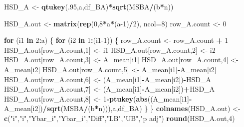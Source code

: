\documentclass[
]{book}
\newenvironment{Shaded}{\begin{snugshade}}{\end{snugshade}}
\newcommand{\AttributeTok}[1]{\textcolor[rgb]{0.13,0.29,0.53}{#1}}
\newcommand{\ControlFlowTok}[1]{\textcolor[rgb]{0.13,0.29,0.53}{\textbf{#1}}}
\newcommand{\DecValTok}[1]{\textcolor[rgb]{0.00,0.00,0.81}{#1}}
\newcommand{\FunctionTok}[1]{\textcolor[rgb]{0.13,0.29,0.53}{\textbf{#1}}}
\newcommand{\NormalTok}[1]{#1}
\newcommand{\OtherTok}[1]{\textcolor[rgb]{0.56,0.35,0.01}{#1}}
\newcommand{\SpecialCharTok}[1]{\textcolor[rgb]{0.81,0.36,0.00}{\textbf{#1}}}
\newcommand{\StringTok}[1]{\textcolor[rgb]{0.31,0.60,0.02}{#1}}
\begin{document}
\begin{Shaded}
\begin{Highlighting}[]
\NormalTok{HSD\_A }\OtherTok{\textless{}{-}} \FunctionTok{qtukey}\NormalTok{(.}\DecValTok{95}\NormalTok{,a,df\_BA)}\SpecialCharTok{*}\FunctionTok{sqrt}\NormalTok{(MSBA}\SpecialCharTok{/}\NormalTok{(b}\SpecialCharTok{*}\NormalTok{n))}

\NormalTok{HSD\_A.out }\OtherTok{\textless{}{-}} \FunctionTok{matrix}\NormalTok{(}\FunctionTok{rep}\NormalTok{(}\DecValTok{0}\NormalTok{,}\DecValTok{8}\SpecialCharTok{*}\NormalTok{a}\SpecialCharTok{*}\NormalTok{(a}\DecValTok{{-}1}\NormalTok{)}\SpecialCharTok{/}\DecValTok{2}\NormalTok{), }\AttributeTok{ncol=}\DecValTok{8}\NormalTok{)}
\NormalTok{row\_A.count }\OtherTok{\textless{}{-}} \DecValTok{0}

\ControlFlowTok{for}\NormalTok{ (i1 }\ControlFlowTok{in} \DecValTok{2}\SpecialCharTok{:}\NormalTok{a) \{}
  \ControlFlowTok{for}\NormalTok{ (i2 }\ControlFlowTok{in} \DecValTok{1}\SpecialCharTok{:}\NormalTok{(i1}\DecValTok{{-}1}\NormalTok{)) \{}
\NormalTok{    row\_A.count }\OtherTok{\textless{}{-}}\NormalTok{ row\_A.count }\SpecialCharTok{+} \DecValTok{1}
\NormalTok{    HSD\_A.out[row\_A.count,}\DecValTok{1}\NormalTok{] }\OtherTok{\textless{}{-}}\NormalTok{ i1}
\NormalTok{    HSD\_A.out[row\_A.count,}\DecValTok{2}\NormalTok{] }\OtherTok{\textless{}{-}}\NormalTok{ i2}
\NormalTok{    HSD\_A.out[row\_A.count,}\DecValTok{3}\NormalTok{] }\OtherTok{\textless{}{-}}\NormalTok{ A\_mean[i1]}
\NormalTok{    HSD\_A.out[row\_A.count,}\DecValTok{4}\NormalTok{] }\OtherTok{\textless{}{-}}\NormalTok{ A\_mean[i2]}
\NormalTok{    HSD\_A.out[row\_A.count,}\DecValTok{5}\NormalTok{] }\OtherTok{\textless{}{-}}\NormalTok{ A\_mean[i1]}\SpecialCharTok{{-}}\NormalTok{A\_mean[i2]}
\NormalTok{    HSD\_A.out[row\_A.count,}\DecValTok{6}\NormalTok{] }\OtherTok{\textless{}{-}}\NormalTok{ (A\_mean[i1]}\SpecialCharTok{{-}}\NormalTok{A\_mean[i2])}\SpecialCharTok{{-}}\NormalTok{HSD\_A}
\NormalTok{    HSD\_A.out[row\_A.count,}\DecValTok{7}\NormalTok{] }\OtherTok{\textless{}{-}}\NormalTok{ (A\_mean[i1]}\SpecialCharTok{{-}}\NormalTok{A\_mean[i2])}\SpecialCharTok{+}\NormalTok{HSD\_A}
\NormalTok{    HSD\_A.out[row\_A.count,}\DecValTok{8}\NormalTok{] }\OtherTok{\textless{}{-}} 
      \DecValTok{1}\SpecialCharTok{{-}}\FunctionTok{ptukey}\NormalTok{(}\FunctionTok{abs}\NormalTok{((A\_mean[i1]}\SpecialCharTok{{-}}\NormalTok{A\_mean[i2])}\SpecialCharTok{/}\FunctionTok{sqrt}\NormalTok{(MSBA}\SpecialCharTok{/}\NormalTok{(b}\SpecialCharTok{*}\NormalTok{n))),a,df\_BA)}
\NormalTok{  \}}
\NormalTok{\}}
\FunctionTok{colnames}\NormalTok{(HSD\_A.out) }\OtherTok{\textless{}{-}} \FunctionTok{c}\NormalTok{(}\StringTok{"i"}\NormalTok{,}\StringTok{"i\textquotesingle{}"}\NormalTok{,}\StringTok{"Ybar\_i"}\NormalTok{,}\StringTok{"Ybar\_i\textquotesingle{}"}\NormalTok{,}\StringTok{"Diff"}\NormalTok{,}\StringTok{"LB"}\NormalTok{,}\StringTok{"UB"}\NormalTok{,}\StringTok{"p adj"}\NormalTok{)}
\FunctionTok{round}\NormalTok{(HSD\_A.out,}\DecValTok{4}\NormalTok{)}
\end{Highlighting}
\end{Shaded}
\end{document}
